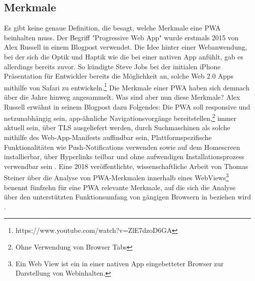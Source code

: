 \subsection{Merkmale}
\label{subsec:markmale}
Es gibt keine genaue Definition, die besagt, welche Merkmale eine PWA beinhalten muss.
Der Begriff "Progressive Web App" wurde erstmals 2015 von Alex Russell in einem Blogpost
verwendet.\cite{PWA2015} Die Idee hinter einer Webanwendung, bei der sich die Optik und Haptik
wie die bei einer nativen App anfühlt, gab es allerdings bereits zuvor. So kündigte
Steve Jobs bei der initialen iPhone Präsentation für Entwickler bereits die Möglichkeit
an, solche Web 2.0 Apps mithilfe von Safari zu entwickeln.\footnote{https://www.youtube.com/watch?v=ZlE7dzoD6GA}
Die Merkmale einer PWA haben sich demnach über die Jahre hinweg angesammelt. Was sind aber
nun diese Merkmale? Alex Russell erwähnt in seinem Blogpost dazu Folgendes:
Die PWA soll responsive und netzunabhängig sein, app-ähnliche Navigationsvorgänge bereitstellen,\footnote{Ohne Verwendung von Browser Tabs} 
immer aktuell sein, über TLS ausgeliefert werden, durch Suchmaschinen als solche mithilfe
des Web-App-Manifests auffindbar sein, Plattformspezifische Funktionalitäten wie Push-Notifications
verwenden sowie auf dem Homescreen installierbar, über Hyperlinks teilbar und ohne aufwendigen
Installationsprozess verwendbar sein \cite{PWA2015}. Eine 2018 veröffentlichte, wissenschaftliche
Arbeit von Thomas Steiner über die Analyse von PWA-Merkmalen innerhalb eines WebViews\footnote{Ein Web View ist ein in einer nativen App eingebetteter Browser zur Darstellung von Webinhalten.}
benennt fünfzehn für eine PWA relevante Merkmale, auf die sich die Analyse über den
unterstützten Funktionsumfang von gängigen Browsern in 
beziehen wird \cite{WhatIsInAWebView}.


